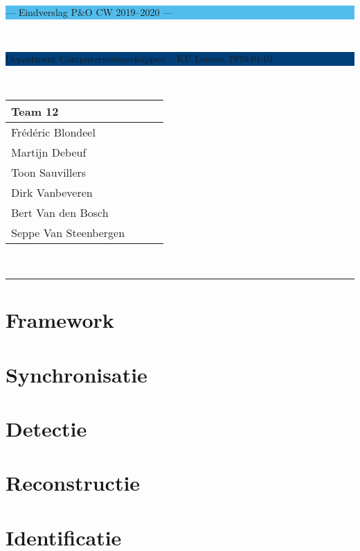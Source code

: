 \documentclass[a4paper,11pt]{article}
\begin{document}
\noindent
\colorbox[HTML]{52BDEC}{\bfseries\parbox{\textwidth}{\centering\large
--- Eindverslag P\&O CW 2019--2020 ---
}}
\\[-1mm]
\colorbox[HTML]{00407A}{\bfseries\color{white}\parbox{\textwidth}{
Department Computerwetenschappen -- KU Leuven
\hfill
\today
}}
\\

\smallskip

\noindent

\begin{tabular}{*4l}
\toprule
\multicolumn{2}{l}{\large\textbf{Team 12}} \\
\midrule
Frédéric Blondeel &\\
Martijn Debeuf &\\
Toon Sauvillers &\\ %
Dirk Vanbeveren  &\\
Bert Van den Bosch & \\
Seppe Van Steenbergen &\\


\bottomrule
\hline
\end{tabular}\\

\noindent
{\color[HTML]{52BDEC} \rule{\linewidth}{1mm} }
\tableofcontents
\newpage

\section{Framework}\label{sec:framework}


\section{Synchronisatie}\label{sec:synchronisatie}


\section{Detectie}\label{sec:detectie}


\section{Reconstructie}\label{sec:reconstructie}


\section{Identificatie}\label{sec:identificatie}







\newpage


\end{document}
